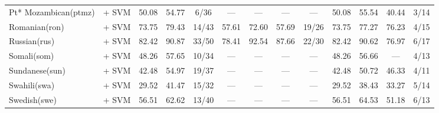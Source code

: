 \begin{table*}[h]
{\begin{tabular}{l|c|ccc|cccc|cccc}
            Pt* Mozambican(ptmz) & \citep{wang2024multilingual}   + SVM                                   & 50.08                        & 54.77                        & 6/36                        & —             & —             & —                 & —             & 50.08         & 55.54         & 40.44             & 3/14          \\
            Romanian(ron)        & \citep{wang2024multilingual}     + SVM                                 & 73.75                        & 79.43                        & 14/43                       & 57.61         & 72.60         & 57.69             & 19/26         & 73.75         & 77.27         & 76.23             & 4/15          \\
            Russian(rus)         & \citep{snegirev2025russianfocusedembeddersexplorationrumteb}     + SVM & 82.42                        & 90.87                        & 33/50                       & 78.41         & 92.54         & 87.66             & 22/30         & 82.42         & 90.62         & 76.97             & 6/17          \\
            Somali(som)          & \citep{wang2024multilingual}       + SVM                               & 48.26                        & 57.65                        & 10/34                       & —             & —             & —                 & —             & 48.26         & 56.66         & —                 & 4/13          \\
            Sundanese(sun)       & \citep{wang2024multilingual}      + SVM                                & 42.48                        & 54.97                        & 19/37                       & —             & —             & —                 & —             & 42.48         & 50.72         & 46.33             & 4/11          \\
            Swahili(swa)         & \citep{wang2024multilingual}      + SVM                                & 29.52                        & 41.47                        & 15/32                       & —             & —             & —                 & —             & 29.52         & 38.43         & 33.27             & 5/14          \\
            Swedish(swe)         & \citep{wang2024multilingual}     + SVM                                 & 56.51                        & 62.62                        & 13/40                       & —             & —             & —                 & —             & 56.51         & 64.53         & 51.18             & 6/13          \\

\end{tabular}}
\end{table*}
